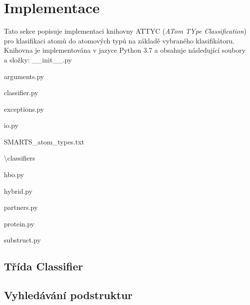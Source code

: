 \chapter{Implementace}
Tato sekce popisuje implementaci knihovny ATTYC (\textit{ATom TYpe Classification}) pro klasifikaci atomů do atomových typů na základě vybraného  klasifikátoru. Knihovna je implementována v jazyce Python 3.7 a obsahuje následující soubory a složky:
\newline
\newline
\noindent\_\_init\_\_.py

\noindent arguments.py 

\noindent classifier.py

\noindent exceptions.py

\noindent io.py

\noindent SMARTS\_atom\_types.txt

\noindent \textbackslash classifiers

hbo.py

hybrid.py

partners.py

protein.py

substruct.py



\section{Třída Classifier}
 \section{Vyhledávání podstruktur}
 

